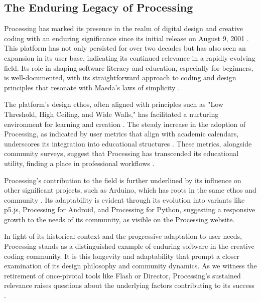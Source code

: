 
\subsection{The Enduring Legacy of Processing} %

Processing has marked its presence in the realm of digital design and creative coding with an enduring significance since its initial release on August 9, 2001 \parencite{processingfoundation20thAnniversaryProcessing2022}. This platform has not only persisted for over two decades but has also seen an expansion in its user base, indicating its continued relevance in a rapidly evolving field. Its role in shaping software literacy and education, especially for beginners, is well-documented, with its straightforward approach to coding and design principles that resonate with Maeda’s laws of simplicity \parencite{JohnMaedaLaws2020}.

The platform's design ethos, often aligned with principles such as "Low Threshold, High Ceiling, and Wide Walls," has facilitated a nurturing environment for learning and creation \parencite{resnickDesignPrinciplesTools}. The steady increase in the adoption of Processing, as indicated by user metrics that align with academic calendars, underscores its integration into educational structures \parencite{fryModernPrometheusHistory2018}. These metrics, alongside community surveys, suggest that Processing has transcended its educational utility, finding a place in professional workflows \parencite{2016CommunitySurvey}.

Processing's contribution to the field is further underlined by its influence on other significant projects, such as Arduino, which has roots in the same ethos and community \parencite{barraganUntoldHistoryArduino2016}. Its adaptability is evident through its evolution into variants like p5.js, Processing for Android, and Processing for Python, suggesting a responsive growth to the needs of its community, as visible on the Processing website.

In light of its historical context and the progressive adaptation to user needs, Processing stands as a distinguished example of enduring software in the creative coding community. It is this longevity and adaptability that prompt a closer examination of its design philosophy and community dynamics. As we witness the retirement of once-pivotal tools like Flash or Director, Processing's sustained relevance raises questions about the underlying factors contributing to its success \parencite{hortonDeathTechnicalSkill} \parencite{steveThoughtsFlashApple2010} \parencite{FutureAdobeContribute2019}.

